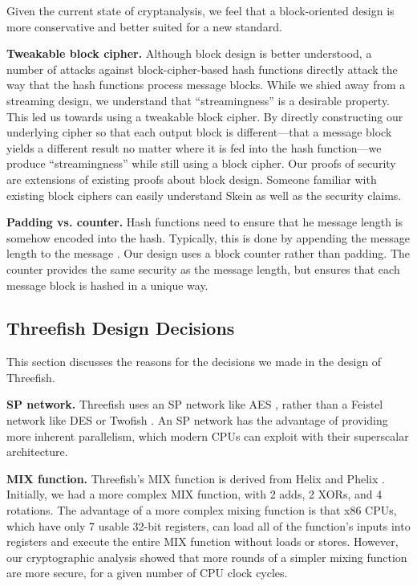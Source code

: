 \documentclass[11pt,twoside]{article}
\begin{document}
Given the current state of cryptanalysis, we feel that a block-oriented design is more conservative and better suited for a new standard.

{\bf Tweakable block cipher.}  Although block design is better understood, a number of attacks against block-cipher-based hash functions directly attack the way that the hash functions process message blocks.  While we shied away from a streaming design, we understand that ``streamingness'' is a desirable property.  This led us towards using a tweakable block cipher.  By directly constructing our underlying cipher so that each output block is different---that a message  block yields a different result no matter where it is fed into the hash function---we produce ``streamingness'' while still using a block cipher.  Our proofs of security are extensions of existing proofs about block design.  Someone familiar with existing block ciphers can easily understand Skein as well as the security claims.

{\bf Padding vs. counter.}  Hash functions need to ensure that he message length is somehow encoded into the hash.  Typically, this is done by appending the message length to the message \cite{MD}.  Our design uses a block counter rather than padding. The counter provides the same security as the message
length, but ensures that each message block is hashed in a unique way.

\subsection{Threefish Design Decisions}\label{sec:threefishdesign}

This section discusses the reasons for the decisions we made in the design of Threefish.

{\bf SP network.} Threefish uses an SP network \cite{Feistel} like AES \cite{AES,AES2}, rather than a Feistel network \cite{Feistel} like DES \cite{DES} or Twofish \cite{Twofish}.  An SP network has the advantage of providing more inherent parallelism, which modern CPUs can exploit with their superscalar architecture.

{\bf MIX function.} Threefish's MIX function is derived from Helix \cite{Helix} and Phelix \cite{Phelix}.  Initially, we had a more complex MIX function, with 2 adds, 2 XORs, and 4 rotations.  The advantage of a more complex mixing function is that x86 CPUs, which have only 7 usable 32-bit registers, can load all of the function's inputs into registers and execute the entire MIX function without loads or stores.  However, our cryptographic analysis showed that more rounds of a simpler mixing function are more secure, for a given number of CPU clock cycles.
\end{document}
